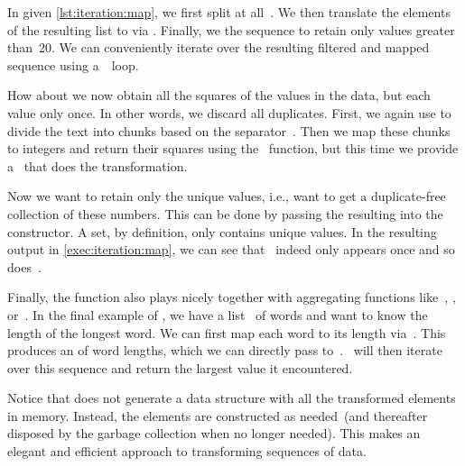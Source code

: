 In  given \cref{lst:iteration:map}, we first split  at all~\pythonil{\",\"}.
We then translate the elements of the resulting list to  via .
Finally, we  the sequence to retain only values greater than~20.
We can conveniently iterate over the resulting filtered and mapped sequence using a~~loop.

How about we now obtain all the squares of the values in the  data, but each value only once.
In other words, we discard all duplicates.
First, we again use  to divide the text into chunks based on the separator~\pythonil{\",\"}.
Then we map these chunks to integers and return their squares using the ~function, but this time we provide a~ that does the transformation.

Now we want to retain only the unique values, i.e., want to get a duplicate-free collection of these numbers.
This can be done by passing the resulting  into the  constructor.
A set, by definition, only contains unique values.
In the resulting output in \cref{exec:iteration:map}, we can see that ~indeed only appears once and so does~.

Finally, the  function also plays nicely together with aggregating functions like~, , or~.
In the final example of , we have a list~ of words and want to know the length of the longest word.
We can first map each word to its length via~.
This produces an  of word lengths, which we can directly pass to~.
~will then iterate over this sequence and return the largest value it encountered.

Notice that  does not generate a data structure with all the transformed elements in memory.
Instead, the elements are constructed as needed~(and thereafter disposed by the garbage collection when no longer needed).
This makes  an elegant and efficient approach to transforming sequences of data.

